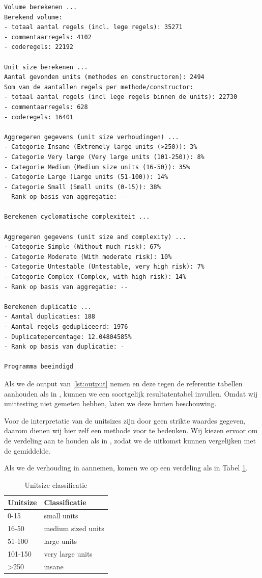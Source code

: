 \documentclass[a4paper]{article}
\begin{document}
\begin{lstlisting}[caption={Programma output SmallSQL},label={lst:output},frame = single]
Volume berekenen ...
Berekend volume: 
- totaal aantal regels (incl. lege regels): 35271
- commentaarregels: 4102
- coderegels: 22192

Unit size berekenen ...
Aantal gevonden units (methodes en constructoren): 2494
Som van de aantallen regels per methode/constructor: 
- totaal aantal regels (incl lege regels binnen de units): 22730
- commentaarregels: 628
- coderegels: 16401

Aggregeren gegevens (unit size verhoudingen) ...
- Categorie Insane (Extremely large units (>250)): 3%
- Categorie Very large (Very large units (101-250)): 8%
- Categorie Medium (Medium size units (16-50)): 35%
- Categorie Large (Large units (51-100)): 14%
- Categorie Small (Small units (0-15)): 38%
- Rank op basis van aggregatie: --

Berekenen cyclomatische complexiteit ...

Aggregeren gegevens (unit size and complexity) ...
- Categorie Simple (Without much risk): 67%
- Categorie Moderate (With moderate risk): 10%
- Categorie Untestable (Untestable, very high risk): 7%
- Categorie Complex (Complex, with high risk): 14%
- Rank op basis van aggregatie: --

Berekenen duplicatie ...
- Aantal duplicaties: 188
- Aantal regels gedupliceerd: 1976
- Duplicatepercentage: 12.04804585%
- Rank op basis van duplicatie: -

Programma beeindigd
\end{lstlisting}
Als we de output van \ref{lst:output} nemen en deze tegen de referentie tabellen aanhouden als in \cite{A}, kunnen we een soortgelijk resultatentabel invullen. Omdat wij unittesting niet gemeten hebben, laten we deze buiten beschouwing.

Voor de interpretatie van de unitsizes zijn door \cite{A} geen strikte waardes gegeven, daarom dienen wij hier zelf een methode voor te bedenken.
Wij kiezen ervoor om de verdeling aan te houden als in \cite{B}, zodat we de uitkomst kunnen vergelijken met de gemiddelde.

Als we de verhouding in \cite{B} aannemen, komen we op een verdeling als in Tabel \ref{tbl:UnitSizeClassificatie}.

\begin{table}[h]
\caption{Unitsize classificatie}
\label{tbl:UnitSizeClassificatie}
\begin{tabular}{|l|l|}
\hline
Unitsize         & Classificatie      \\ \hline
0-15             & small units        \\
16-50            & medium sized units \\
51-100           & large units        \\
101-150          & very large units   \\
\textgreater{}250& insane             \\ \hline
\end{tabular}
\end{table}
\end{document}
